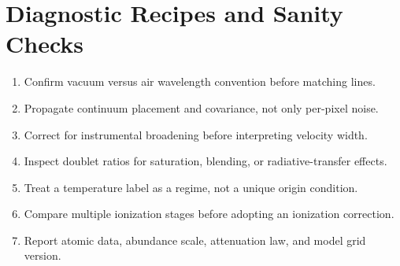\chapter{Diagnostic Recipes and Sanity Checks}
\label{app:recipes}

\begin{enumerate}[leftmargin=*]
  \item Confirm vacuum versus air wavelength convention before matching lines.
  \item Propagate continuum placement and covariance, not only per-pixel noise.
  \item Correct for instrumental broadening before interpreting velocity width.
  \item Inspect doublet ratios for saturation, blending, or radiative-transfer effects.
  \item Treat a temperature label as a regime, not a unique origin condition.
  \item Compare multiple ionization stages before adopting an ionization correction.
  \item Report atomic data, abundance scale, attenuation law, and model grid version.
\end{enumerate}
